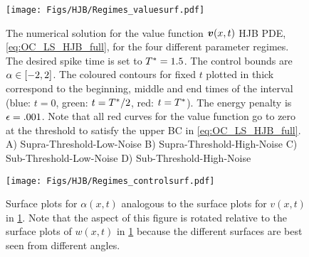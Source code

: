 \begin{figure}[h!]
\begin{center}
\texttt{[image: Figs/HJB/Regimes\_valuesurf.pdf]}
\caption{The numerical solution for the value function ${ \boldsymbol{v} }(x,t)$ HJB PDE,
\cref{eq:OC_LS_HJB_full}, for the four different parameter regimes.
The desired spike time is set to ${ T^* }=1.5$.
The control bounds are $\alpha \in [-2,2]$. 
The coloured contours for fixed $t$ plotted in thick correspond to the
beginning, middle and end times of the interval (blue: $t=0$, green:
$t={ T^* }/2$, red: $t={ T^* }$).
The energy penalty is ${\epsilon} = .001$. 
Note that all red curves for the value function go to zero at the threshold to
satisfy the upper BC in \cref{eq:OC_LS_HJB_full}.
\\
A) Supra-Threshold-Low-Noise
B) Supra-Threshold-High-Noise
C) Sub-Threshold-Low-Noise 
D) Sub-Threshold-High-Noise  }
\label{fig:HJB_4regimes_value_surf}
\end{center}
\end{figure}
\begin{figure}[htp]
\begin{center}
  \texttt{[image: Figs/HJB/Regimes\_controlsurf.pdf]}
  \caption{Surface plots for $\alpha(x,t)$ analogous to the surface
  plots for $v(x,t)$ in \cref{fig:HJB_4regimes_value_surf}. 
Note that the aspect of this figure is rotated
relative to the surface plots of $w(x,t)$ in \cref{fig:HJB_4regimes_value_surf}
because the different surfaces are best seen from different angles.}
  \label{fig:HJB__4regimes_control_surf}
\end{center}
\end{figure}    

